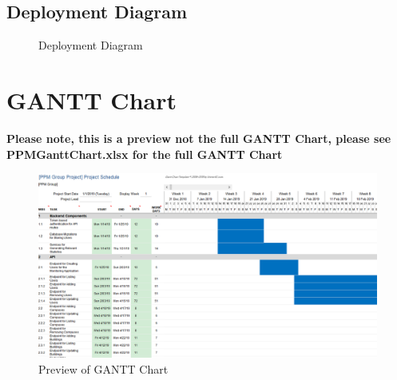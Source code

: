 \documentclass[
  english,
  a4paper,
,tablecaptionabove
]{scrartcl}
\begin{document}
\newpage

\begin{landscape}

\pagestyle{empty}

\hypertarget{deployment-diagram}{%
\section{Deployment Diagram}\label{deployment-diagram}}

\begin{figure}
    \caption{Deployment Diagram} \label{fig:deployment-diagram}
\end{figure}

\end{landscape}

\newpage

\hypertarget{gantt-chart}{%
\section{GANTT Chart}\label{gantt-chart}}

\textbf{Please note, this is a preview not the full GANTT Chart, please
see PPMGanttChart.xlsx for the full GANTT Chart}

\begin{figure}
\centering
\includegraphics{images/ppm-images/gantt-chart-preview.png}
\caption{Preview of GANTT Chart}
\end{figure}
\end{document}
